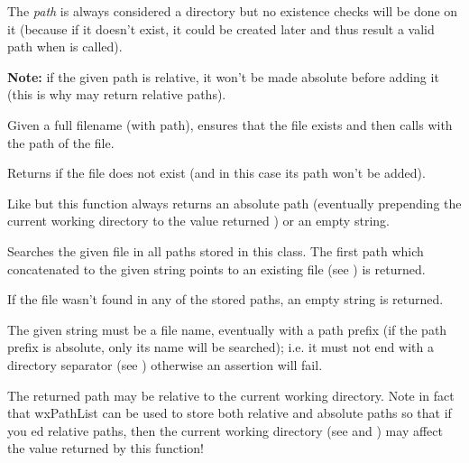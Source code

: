 The {\it path} is always considered a directory but no existence checks will be done on it
(because if it doesn't exist, it could be created later and thus result a valid path when
 is called).

{\bf Note:} if the given path is relative, it won't be made absolute before adding it
(this is why  may return relative paths).


\label{wxpathlistensurefileaccessible}


Given a full filename (with path), ensures that the file exists and
then calls  with the path of the file.

Returns \false if the file does not exist (and in this case its path won't be added).


\label{wxpathlistfindabsolutepath}


Like  but this function always
returns an absolute path (eventually prepending the current working directory
to the value returned ) or an
empty string.


\label{wxpathlistfindvalidpath}


Searches the given file in all paths stored in this class.
The first path which concatenated to the given string points to an existing
file (see ) is returned.

If the file wasn't found in any of the stored paths, an empty string is returned.

The given string must be a file name, eventually with a path prefix (if the path
prefix is absolute, only its name will be searched); i.e. it must not end with
a directory separator (see )
otherwise an assertion will fail.

The returned path may be relative to the current working directory.
Note in fact that wxPathList can be used to store both relative and absolute paths so that
if you ed relative paths, then the current working directory
(see  and )
may affect the value returned by this function!

